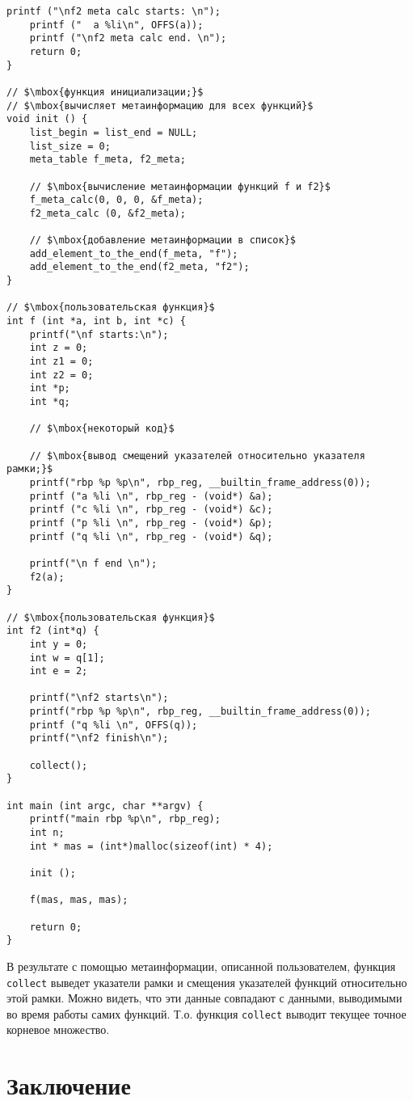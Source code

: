 \begin{lstlisting}[mathescape=true]
	printf ("\nf2 meta calc starts: \n");
	printf ("  a %li\n", OFFS(a));
	printf ("\nf2 meta calc end. \n");
	return 0;
}

// $\mbox{функция инициализации;}$
// $\mbox{вычисляет метаинформацию для всех функций}$
void init () {
	list_begin = list_end = NULL;
	list_size = 0;
	meta_table f_meta, f2_meta;
	
	// $\mbox{вычисление метаинформации функций f и f2}$
	f_meta_calc(0, 0, 0, &f_meta);
	f2_meta_calc (0, &f2_meta);
	
	// $\mbox{добавление метаинформации в список}$
	add_element_to_the_end(f_meta, "f");
	add_element_to_the_end(f2_meta, "f2");
} 
 
// $\mbox{пользовательская функция}$
int f (int *a, int b, int *c) {
	printf("\nf starts:\n");
	int z = 0;
	int z1 = 0;
	int z2 = 0;
	int *p;
	int *q;

	// $\mbox{некоторый код}$
     
	// $\mbox{вывод смещений указателей относительно указателя рамки;}$
	printf("rbp %p %p\n", rbp_reg, __builtin_frame_address(0));
	printf ("a %li \n", rbp_reg - (void*) &a);
	printf ("c %li \n", rbp_reg - (void*) &c);
	printf ("p %li \n", rbp_reg - (void*) &p);
	printf ("q %li \n", rbp_reg - (void*) &q);

	printf("\n f end \n");
	f2(a);
}

// $\mbox{пользовательская функция}$
int f2 (int*q) {
	int y = 0;
	int w = q[1];
	int e = 2;
	
	printf("\nf2 starts\n");
	printf("rbp %p %p\n", rbp_reg, __builtin_frame_address(0));
	printf ("q %li \n", OFFS(q));
	printf("\nf2 finish\n");

	collect();
}

int main (int argc, char **argv) {
	printf("main rbp %p\n", rbp_reg);
	int n;
	int * mas = (int*)malloc(sizeof(int) * 4);

	init ();

	f(mas, mas, mas);
  
	return 0;
}
\end{lstlisting}

В результате с помощью метаинформации, описанной пользователем, функция \lstinline{collect} выведет указатели
рамки и смещения указателей функций относительно этой рамки. Можно видеть, что эти данные совпадают с данными,
выводимыми во время работы самих функций. Т.о. функция \lstinline{collect} выводит текущее точное корневое
множество.

\section*{Заключение}

